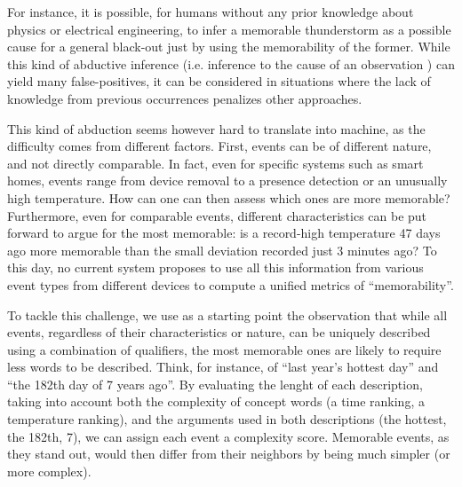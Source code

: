 \documentclass[conference]{IEEEtran}
\begin{document}
For instance, it is possible, for humans without any prior knowledge about
physics or electrical engineering, to infer a memorable thunderstorm as a
possible cause for a general black-out just by using the memorability of
the former. While this kind of abductive inference (i.e. inference to the cause
of an observation \cite{magnani_abduction_2011}) can yield many
false-positives, it can be considered in situations where the lack of knowledge
from previous occurrences penalizes other approaches.


This kind of abduction seems however hard to translate into machine, as the difficulty
comes from different factors. First, events can be of different nature, and not
directly comparable. In fact, even for specific systems such as smart homes,
events range from device removal to a presence detection or an unusually high
temperature. How can one can then assess which ones are more memorable?
Furthermore, even for comparable events, different characteristics can be put
forward to argue for the most memorable: is a record-high temperature 47 days
ago more memorable than the small deviation recorded just 3 minutes ago? To this
day, no current system proposes to use all this information from various event
types from different devices to compute a unified metrics of ``memorability''.


To tackle this challenge, we use as a starting point the observation that while
all events, regardless of their characteristics or nature, can be uniquely
described using a combination of qualifiers, the most memorable ones are likely
to require less words to be described. Think, for instance, of ``last year's
hottest day'' and ``the 182th day of 7 years ago''. By evaluating the lenght of
each description, taking into account both the complexity of concept words (a
time ranking, a temperature ranking), and the arguments used in both
descriptions (the hottest, the 182th, 7), we can assign each event a complexity
score. Memorable events, as they stand out, would then differ from their
neighbors by being much simpler (or more complex).
\end{document}
